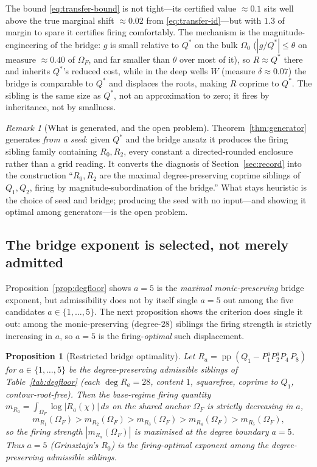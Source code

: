 \documentclass[11pt,reqno]{amsart}
\theoremstyle{plain}
\newtheorem{proposition}[theorem]{Proposition}
\theoremstyle{definition}
\theoremstyle{remark}
\newtheorem{remark}[theorem]{Remark}
\DeclareMathOperator{\pp}{pp}
\begin{document}
The bound \eqref{eq:transfer-bound} is not tight---its certified value $\approx0.1$
sits well above the true marginal shift $\approx0.02$ from
\eqref{eq:transfer-id}---but with $1.3$ of margin to spare it certifies firing
comfortably. The mechanism is the magnitude-engineering of the bridge: $g$ is small
relative to $Q^*$ on the bulk
$\Omega_0$ ($|g/Q^*|\le\theta$ on measure $\approx0.40$ of $\Omega_F$, and far smaller
than $\theta$ over most of it), so $R\approx Q^*$ there and inherits $Q^*$'s reduced
cost, while in the deep wells $W$ (measure $\delta\approx0.07$) the bridge is comparable
to $Q^*$ and displaces the roots, making $R$ coprime to $Q^*$. The sibling is the same
size as $Q^*$, not an approximation to zero; it fires by inheritance, not by smallness.

\begin{remark}[What is generated, and the open problem]\label{rem:gen-scope}
Theorem~\ref{thm:generator} generates \emph{from a seed}: given $Q^*$ and the bridge
ansatz it produces the firing sibling family containing $R_0,R_2$, every constant a
directed-rounded enclosure rather than a grid reading. It converts the diagnosis of
Section~\ref{sec:record} into the construction ``$R_0,R_2$ are the maximal
degree-preserving coprime siblings of $Q_1,Q_2$, firing by magnitude-subordination of
the bridge.'' What stays heuristic is the choice of seed and bridge; producing the seed
with no input---and showing it optimal among generators---is the open problem.
\end{remark}

\subsection*{The bridge exponent is selected, not merely admitted}
Proposition~\ref{prop:degfloor} shows $a=5$ is the \emph{maximal monic-preserving}
bridge exponent, but admissibility does not by itself single $a=5$ out among the five
candidates $a\in\{1,\dots,5\}$. The next proposition shows the criterion does single it
out: among the monic-preserving (degree-$28$) siblings the firing strength is strictly
increasing in $a$, so $a=5$ is the firing-\emph{optimal} such displacement.

\begin{proposition}[Restricted bridge optimality]
\label{prop:restricted-opt}
Let $R_a=\pp(Q_1-P_1^aP_2^aP_4\,P_8)$ for $a\in\{1,\dots,5\}$ be the degree-preserving
admissible siblings of Table~\ref{tab:degfloor} (each $\deg R_a=28$, content $1$,
squarefree, coprime to $Q_1$, contour-root-free). Then the base-regime firing quantity
$m_{R_a}=\int_{\Omega_F}\log|R_a(\chi)|\,ds$ on the shared anchor $\Omega_F$ is strictly
decreasing in $a$,
\[
  m_{R_1}(\Omega_F)>m_{R_2}(\Omega_F)>m_{R_3}(\Omega_F)
  >m_{R_4}(\Omega_F)>m_{R_5}(\Omega_F),
\]
so the firing strength $|m_{R_a}(\Omega_F)|$ is maximised at the degree boundary
$a=5$. Thus $a=5$ (Grinsztajn's $R_0$) is the firing-optimal exponent among the
degree-preserving admissible siblings.
\end{proposition}
\end{document}
